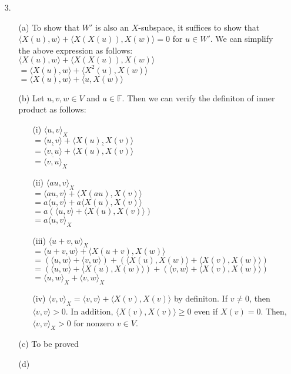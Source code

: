\documentclass{article}
\begin{document}
\begin{itemize}
	\item [3.]
	      \begin{itemize}
			  \item [(a)] 
			  To show that $W'$ is also an $X$-subspace, it suffices to show that $\langle X(u),w\rangle+\langle X(X(u)),X(w)\rangle=0$ for $u\in W'$. We can simplify the above expression as follows:\\$\langle X(u),w\rangle+\langle X(X(u)),X(w)\rangle$\\$=\langle X(u),w\rangle+\langle X^2(u),X(w)\rangle$\\$=\langle X(u),w\rangle+\langle u,X(w)\rangle$
		      \item [(b)] Let $u,v,w\in V$ and $a\in\mathbb{F}$. Then we can verify the definiton of inner product as follows:
		            \begin{itemize}
			            \item [(i)] $\langle u,v\rangle_X$\\$=\langle u,v\rangle+\langle X(u),X(v)\rangle$\\$=\overline{\langle v,u\rangle}+\overline{\langle X(u),X(v)\rangle}$\\$=\overline{\langle v,u\rangle}_X$
			            \item [(ii)] $\langle au,v\rangle_X$\\$=\langle au,v\rangle+\langle X(au),X(v)\rangle$\\$=a\langle u,v\rangle+a\langle X(u),X(v)\rangle$\\$=a(\langle u,v\rangle+\langle X(u),X(v)\rangle)$\\$=a\langle u,v\rangle_X$
			            \item [(iii)] $\langle u+v,w\rangle_X$\\$=\langle u+v,w\rangle+\langle X(u+v),X(w)\rangle$\\$=(\langle u,w\rangle+\langle v,w\rangle)+(\langle X(u),X(w)\rangle+\langle X(v),X(w)\rangle)$\\$=(\langle u,w\rangle+\langle X(u),X(w)\rangle)+(\langle v,w\rangle+\langle X(v),X(w)\rangle)$\\$=\langle u,w\rangle_X+\langle v,w\rangle_X$
			            \item [(iv)] $\langle v,v\rangle_X=\langle v,v\rangle+\langle X(v),X(v)\rangle$ by definiton. If $v\neq 0$, then $\langle v,v\rangle>0$. In addition, $\langle X(v),X(v)\rangle\geq 0$ even if $X(v)=0$. Then, $\langle v,v\rangle_X>0$ for nonzero $v\in V$.
		            \end{itemize}
		      \item [(c)] To be proved
		      \item [(d)]
	      \end{itemize}
\end{itemize}
\end{document}
